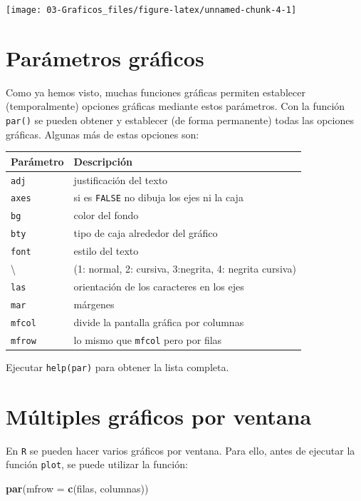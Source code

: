 \documentclass[]{book}
\newenvironment{Shaded}{\begin{snugshade}}{\end{snugshade}}
\newcommand{\DataTypeTok}[1]{\textcolor[rgb]{0.13,0.29,0.53}{#1}}
\newcommand{\KeywordTok}[1]{\textcolor[rgb]{0.13,0.29,0.53}{\textbf{#1}}}
\newcommand{\NormalTok}[1]{#1}
\begin{document}
\begin{center}\texttt{[image: 03-Graficos\_files/figure-latex/unnamed-chunk-4-1]} \end{center}

\hypertarget{parametros-graficos}{%
\section{Parámetros gráficos}\label{parametros-graficos}}

Como ya hemos visto, muchas funciones gráficas permiten establecer (temporalmente)
opciones gráficas mediante estos parámetros.
Con la función \texttt{par()} se pueden obtener y establecer (de forma permanente) todas las opciones gráficas.
Algunas más de estas opciones son:

\begin{longtable}[]{@{}ll@{}}
\toprule
Parámetro & Descripción\tabularnewline
\midrule
\endhead
\texttt{adj} & justificación del texto\tabularnewline
\texttt{axes} & si es \texttt{FALSE} no dibuja los ejes ni la caja\tabularnewline
\texttt{bg} & color del fondo\tabularnewline
\texttt{bty} & tipo de caja alrededor del gráfico\tabularnewline
\texttt{font} & estilo del texto\tabularnewline
\textbackslash{} & (1: normal, 2: cursiva, 3:negrita, 4: negrita cursiva)\tabularnewline
\texttt{las} & orientación de los caracteres en los ejes\tabularnewline
\texttt{mar} & márgenes\tabularnewline
\texttt{mfcol} & divide la pantalla gráfica por columnas\tabularnewline
\texttt{mfrow} & lo mismo que \texttt{mfcol} pero por filas\tabularnewline
\bottomrule
\end{longtable}

Ejecutar \texttt{help(par)} para obtener la lista completa.

\hypertarget{multiples-graficos-por-ventana}{%
\section{Múltiples gráficos por ventana}\label{multiples-graficos-por-ventana}}

En \texttt{R} se pueden
hacer varios gráficos por ventana. Para ello, antes de ejecutar la
función \texttt{plot}, se puede utilizar la función:

\begin{Shaded}
\begin{Highlighting}[]
\KeywordTok{par}\NormalTok{(}\DataTypeTok{mfrow =} \KeywordTok{c}\NormalTok{(filas, columnas))}
\end{Highlighting}
\end{Shaded}
\end{document}
